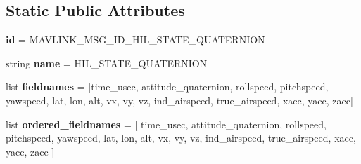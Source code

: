 \subsection*{Static Public Attributes}
\begin{DoxyCompactItemize}
\item 
\mbox{\label{classpymavlink_1_1dialects_1_1v10_1_1MAVLink__hil__state__quaternion__message_a817191bd8472bee52d0d1ebe50420565}} 
{\bfseries id} = M\+A\+V\+L\+I\+N\+K\+\_\+\+M\+S\+G\+\_\+\+I\+D\+\_\+\+H\+I\+L\+\_\+\+S\+T\+A\+T\+E\+\_\+\+Q\+U\+A\+T\+E\+R\+N\+I\+ON
\item 
\mbox{\label{classpymavlink_1_1dialects_1_1v10_1_1MAVLink__hil__state__quaternion__message_a303dc8221a15834c52d1a3caa3bc1738}} 
string {\bfseries name} = \textquotesingle{}H\+I\+L\+\_\+\+S\+T\+A\+T\+E\+\_\+\+Q\+U\+A\+T\+E\+R\+N\+I\+ON\textquotesingle{}
\item 
\mbox{\label{classpymavlink_1_1dialects_1_1v10_1_1MAVLink__hil__state__quaternion__message_a0afd20591ceebaaa3db5f1706493d94a}} 
list {\bfseries fieldnames} = \mbox{[}\textquotesingle{}time\+\_\+usec\textquotesingle{}, \textquotesingle{}attitude\+\_\+quaternion\textquotesingle{}, \textquotesingle{}rollspeed\textquotesingle{}, \textquotesingle{}pitchspeed\textquotesingle{}, \textquotesingle{}yawspeed\textquotesingle{}, \textquotesingle{}lat\textquotesingle{}, \textquotesingle{}lon\textquotesingle{}, \textquotesingle{}alt\textquotesingle{}, \textquotesingle{}vx\textquotesingle{}, \textquotesingle{}vy\textquotesingle{}, \textquotesingle{}vz\textquotesingle{}, \textquotesingle{}ind\+\_\+airspeed\textquotesingle{}, \textquotesingle{}true\+\_\+airspeed\textquotesingle{}, \textquotesingle{}xacc\textquotesingle{}, \textquotesingle{}yacc\textquotesingle{}, \textquotesingle{}zacc\textquotesingle{}\mbox{]}
\item 
\mbox{\label{classpymavlink_1_1dialects_1_1v10_1_1MAVLink__hil__state__quaternion__message_a8b11f13a89f31918498a7ed6663ca869}} 
list {\bfseries ordered\+\_\+fieldnames} = \mbox{[} \textquotesingle{}time\+\_\+usec\textquotesingle{}, \textquotesingle{}attitude\+\_\+quaternion\textquotesingle{}, \textquotesingle{}rollspeed\textquotesingle{}, \textquotesingle{}pitchspeed\textquotesingle{}, \textquotesingle{}yawspeed\textquotesingle{}, \textquotesingle{}lat\textquotesingle{}, \textquotesingle{}lon\textquotesingle{}, \textquotesingle{}alt\textquotesingle{}, \textquotesingle{}vx\textquotesingle{}, \textquotesingle{}vy\textquotesingle{}, \textquotesingle{}vz\textquotesingle{}, \textquotesingle{}ind\+\_\+airspeed\textquotesingle{}, \textquotesingle{}true\+\_\+airspeed\textquotesingle{}, \textquotesingle{}xacc\textquotesingle{}, \textquotesingle{}yacc\textquotesingle{}, \textquotesingle{}zacc\textquotesingle{} \mbox{]}

\end{DoxyCompactItemize}
